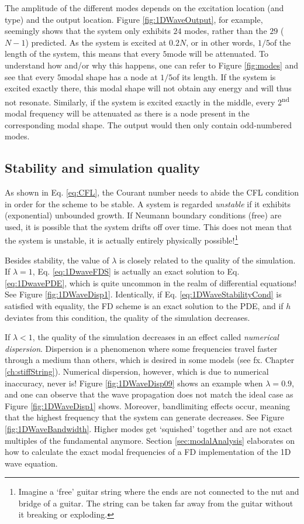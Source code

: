 The amplitude of the different modes depends on the excitation location (and type) and the output location. 
Figure \ref{fig:1DWaveOutput}, for example, seemingly shows that the system only exhibits $24$ modes, rather than the $29$ ($N-1$) predicted. As the system is excited at $0.2N$, or in other words, $1/5$\th of the length of the system, this means that every $5$\th mode will be attenuated.
To understand how and/or why this happens, one can refer to Figure \ref{fig:modes} and see that every $5$\th modal shape has a node at $1/5$\th of its length. If the system is excited exactly there, this modal shape will not obtain any energy and will thus not resonate. Similarly, if the system is excited exactly in the middle, every 2\textsuperscript{nd} modal frequency will be attenuated as there is a node present in the corresponding modal shape. The output would then only contain odd-numbered modes. 

\subsection{Stability and simulation quality}\label{sec:quality1DWave}
As shown in Eq. \eqref{eq:CFL}, the Courant number needs to abide the CFL condition in order for the scheme to be stable. A system is regarded \textit{unstable} if it exhibits (exponential) unbounded growth. If Neumann boundary conditions (free) are used, it is possible that the system drifts off over time. This does not mean that the system is unstable, it is actually entirely physically possible!\footnote{Imagine a `free' guitar string where the ends are not connected to the nut and bridge of a guitar. The string can be taken far away from the guitar without it breaking or exploding.}

Besides stability, the value of $\lambda$ is closely related to the quality of the simulation. 
If $\lambda = 1$, Eq. \eqref{eq:1DwaveFDS} is actually an exact solution to Eq. \eqref{eq:1DwavePDE}, which is quite uncommon in the realm of differential equations! See Figure \ref{fig:1DWaveDisp1}. Identically, if Eq. \eqref{eq:1DWaveStabilityCond} is satisfied with equality, the FD scheme is an exact solution to the PDE, and if $h$ deviates from this condition, the quality of the simulation decreases. 

If $\lambda < 1$, the quality of the simulation decreases in an effect called \textit{numerical dispersion}. Dispersion is a phenomenon where some frequencies travel faster through a medium than others, which is desired in some models (see fx. Chapter \ref{ch:stiffString}). Numerical dispersion, however, which is due to numerical inaccuracy, never is! Figure \ref{fig:1DWaveDisp09} shows an example when $\lambda = 0.9$, and one can observe that the wave propagation does not match the ideal case as Figure \ref{fig:1DWaveDisp1} shows. Moreover, bandlimiting effects occur, meaning that the highest frequency that the system can generate decreases. See Figure \ref{fig:1DWaveBandwidth}. Higher modes get `squished' together and are not exact multiples of the fundamental anymore. Section \ref{sec:modalAnalysis} elaborates on how to calculate the exact modal frequencies of a FD implementation of the 1D wave equation.

